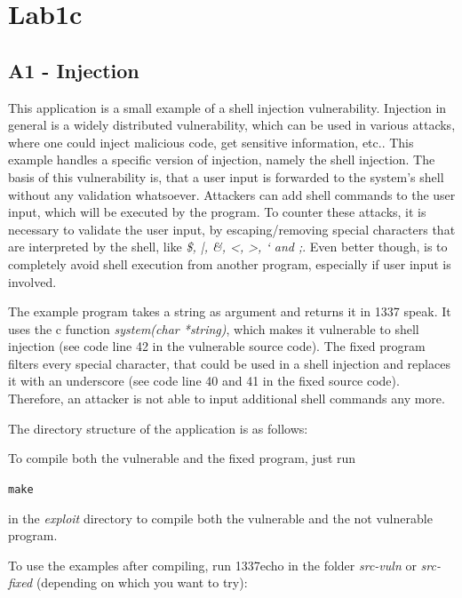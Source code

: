 \documentclass[12pt,a4paper,titlepage,oneside]{scrartcl}
\begin{document}
\newpage
\section{Lab1c}

\subsection{A1 - Injection}
This application is a small example of a shell injection vulnerability. Injection in general is a widely distributed vulnerability, which can be used
in various attacks, where one could inject malicious code, get sensitive information, etc.. This example handles a specific version of injection, namely the shell injection. The basis of this vulnerability is, that a user input is forwarded to the system's shell without any validation whatsoever. Attackers can add shell commands to the user input, which will be executed by the program. To counter these attacks, it is necessary to validate the user input, by escaping/removing special characters that are interpreted by the shell, like  \textit{\$, |, \&, <, >, ` and ;}. Even better though, is to completely avoid shell execution from another program, especially if user input is involved.

The example program takes a string as argument and returns it in 1337 speak. It uses the c function
\textit{system(char *string)}, which makes it vulnerable to shell injection (see code line 42 in the vulnerable source code). The fixed program filters
every special character, that could be used in a shell injection and replaces it with an
underscore (see code line 40 and 41 in the fixed source code). Therefore, an attacker is not able to input additional shell commands any more.

The directory structure of the application is as follows:


To compile both the vulnerable and the fixed program, just run

\lstinline{make}

in the \textit{exploit} directory to compile both the vulnerable and the not vulnerable program.

To use the examples after compiling, run 1337echo in the folder \textit{src-vuln} or \textit{src-fixed} (depending on which you want to try):
\end{document}

